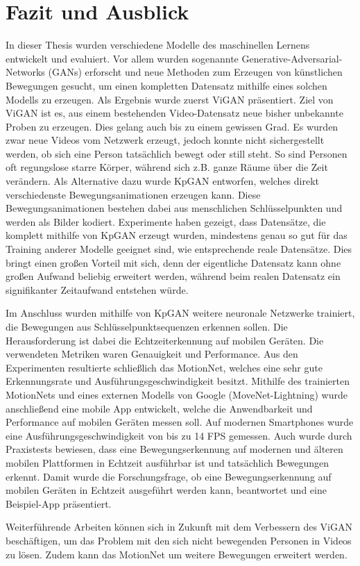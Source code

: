 \chapter{Fazit und Ausblick}
In dieser Thesis wurden verschiedene Modelle des maschinellen Lernens entwickelt
und evaluiert. Vor allem wurden sogenannte Generative-Adversarial-Networks
(GANs) erforscht und neue Methoden zum Erzeugen von künstlichen Bewegungen
gesucht, um einen kompletten Datensatz mithilfe eines solchen Modells zu
erzeugen. Als Ergebnis wurde zuerst ViGAN präsentiert. Ziel von ViGAN ist es,
aus einem bestehenden Video-Datensatz neue bisher unbekannte Proben zu erzeugen.
Dies gelang auch bis zu einem gewissen Grad. Es wurden zwar neue Videos vom
Netzwerk erzeugt, jedoch konnte nicht sichergestellt werden, ob sich eine Person
tatsächlich bewegt oder still steht.  So sind Personen oft regungslose starre
Körper, während sich z.B. ganze Räume über die Zeit verändern. Als Alternative
dazu wurde KpGAN entworfen, welches direkt verschiedenste Bewegungsanimationen
erzeugen kann. Diese Bewegungsanimationen bestehen dabei aus menschlichen
Schlüsselpunkten und werden als Bilder kodiert.  Experimente haben gezeigt, dass
Datensätze, die komplett mithilfe von KpGAN erzeugt wurden, mindestens genau so
gut für das Training anderer Modelle geeignet sind, wie entsprechende reale
Datensätze.  Dies bringt einen großen Vorteil mit sich, denn der eigentliche
Datensatz kann ohne großen Aufwand beliebig erweitert werden, während beim
realen Datensatz ein signifikanter Zeitaufwand entstehen würde.

Im Anschluss wurden mithilfe von KpGAN weitere neuronale Netzwerke trainiert,
die Bewegungen aus Schlüsselpunktsequenzen erkennen sollen.  Die Herausforderung
ist dabei die Echtzeiterkennung auf mobilen Geräten. Die verwendeten Metriken
waren Genauigkeit und Performance. Aus den Experimenten resultierte schließlich
das MotionNet, welches eine sehr gute Erkennungsrate und Ausführungsgeschwindigkeit
besitzt.  Mithilfe des trainierten MotionNets und eines externen Modells von
Google (MoveNet-Lightning) wurde anschließend eine mobile App entwickelt, welche
die Anwendbarkeit und Performance auf mobilen Geräten messen soll. Auf modernen
Smartphones wurde eine Aus\-führ\-ungs\-ge\-schwindig\-keit von bis zu 14 FPS
gemessen. Auch wurde durch Praxistests bewiesen, dass eine Bewegungserkennung
auf modernen und älteren mobilen Plattformen in Echtzeit ausführbar ist und
tatsächlich Bewegungen erkennt. Damit wurde die Forschungsfrage, ob eine
Bewegungserkennung auf mobilen Geräten in Echtzeit ausgeführt werden kann,
beantwortet und eine Beispiel-App präsentiert.

Weiterführende Arbeiten können sich in Zukunft mit dem Verbessern des ViGAN
be\-schäf\-tigen, um das Problem mit den sich nicht bewegenden Personen in
Videos zu lösen. Zudem kann das MotionNet um weitere Bewegungen erweitert
werden.
